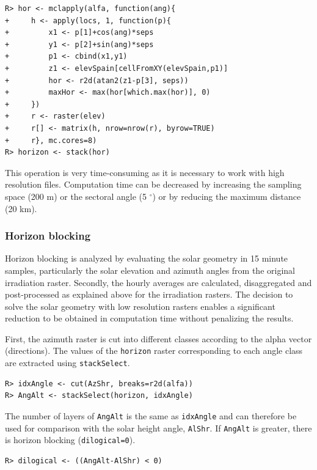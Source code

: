 \documentclass[11pt, english]{article}
\begin{document}
\lstset{language=R,numbers=none}
\begin{lstlisting} 
R> hor <- mclapply(alfa, function(ang){
+     h <- apply(locs, 1, function(p){
+         x1 <- p[1]+cos(ang)*seps
+         y1 <- p[2]+sin(ang)*seps
+         p1 <- cbind(x1,y1)
+         z1 <- elevSpain[cellFromXY(elevSpain,p1)]
+         hor <- r2d(atan2(z1-p[3], seps))
+         maxHor <- max(hor[which.max(hor)], 0)
+     })
+     r <- raster(elev)
+     r[] <- matrix(h, nrow=nrow(r), byrow=TRUE)
+     r}, mc.cores=8)
R> horizon <- stack(hor)
\end{lstlisting}

This operation is very time-consuming as it is necessary to work with
high resolution files. Computation time can be decreased by increasing
the sampling space (200 m) or the sectoral angle (5 $^\circ$) or by
reducing the maximum distance (20 km).

\subsubsection{Horizon blocking}
\label{sec-1-5-2}


Horizon blocking is analyzed by evaluating the solar geometry in 15
minute samples, particularly the solar elevation and azimuth angles
from the original irradiation raster. Secondly, the hourly averages
are calculated, disaggregated and post-processed as explained above
for the irradiation rasters. The decision to solve the solar geometry
with low resolution rasters enables a significant reduction to be
obtained in computation time without penalizing the results.

First, the azimuth raster is cut into different classes according to
the alpha vector (directions). The values of the \texttt{horizon}
raster corresponding to each angle class are extracted using
\texttt{stackSelect}.

\lstset{language=R,numbers=none}
\begin{lstlisting} 
R> idxAngle <- cut(AzShr, breaks=r2d(alfa))
R> AngAlt <- stackSelect(horizon, idxAngle)
\end{lstlisting}

The number of layers of \texttt{AngAlt} is the same as
\texttt{idxAngle} and can therefore be used for comparison with the
solar height angle, \texttt{AlShr}. If \texttt{AngAlt} is greater,
there is horizon blocking (\texttt{dilogical=0}).

\lstset{language=R,numbers=none}
\begin{lstlisting} 
R> dilogical <- ((AngAlt-AlShr) < 0)
\end{lstlisting}
\end{document}
